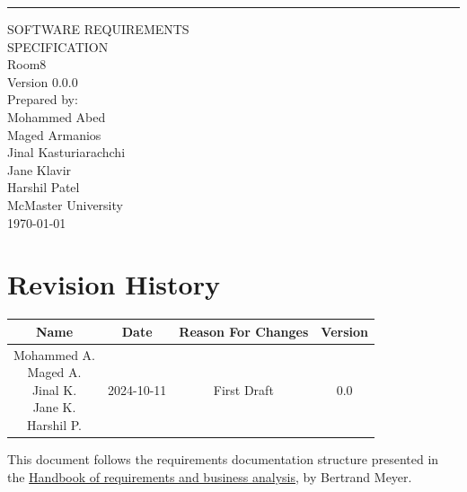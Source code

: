 \documentclass{scrreprt}
\date{}
\def\myversion{0.0.0}
\theoremstyle{definition}
\begin{document}
\begin{center}
    \rule{16cm}{5pt}\vskip1cm
    \begin{bfseries}
        \Huge{SOFTWARE REQUIREMENTS\\ SPECIFICATION}\\
        \vspace{1.9cm}
        Room8\\
        \vspace{1.9cm}
        \LARGE{Version \myversion}\\
        \vspace{1.9cm}
        Prepared by:\\
        Mohammed Abed\\ 
        Maged Armanios\\
        Jinal Kasturiarachchi\\
        Jane Klavir\\
        Harshil Patel\\
        \vspace{0.9cm}
        McMaster University\\
        \vspace{0.9cm}
        \today\\
    \end{bfseries}
\end{center}

\chapter*{Revision History}

\begin{center}
    \begin{tabular}{|c|c|c|c|}
        \hline
        Name        & Date          & Reason For Changes & Version\\
        \hline
        \hline
        \makecell{Mohammed A. \\ Maged A. \\ Jinal K. \\ Jane K. \\ Harshil P.} & 2024-10-11 & First Draft & 0.0\\
        \hline
    \end{tabular}
\end{center}

This document follows the requirements documentation structure presented in the \href{ https://link.springer.com/content/pdf/10.1007/978-3-031-06739-6.pdf}{Handbook of requirements and business analysis}, by Bertrand Meyer.
\end{document}
